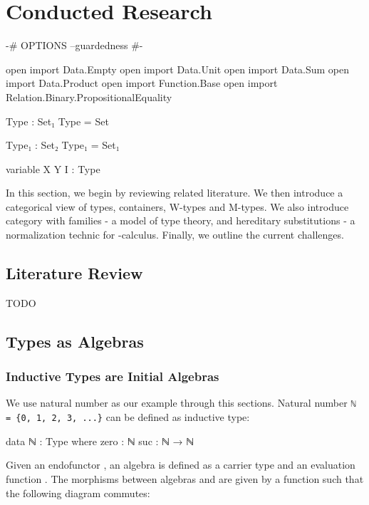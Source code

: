 \chapter{Conducted Research}

\begin{code}[hide]
{-# OPTIONS --guardedness #-}

open import Data.Empty
open import Data.Unit
open import Data.Sum
open import Data.Product
open import Function.Base
open import Relation.Binary.PropositionalEquality

Type : Set₁
Type = Set

Type₁ : Set₂
Type₁ = Set₁

variable X Y I : Type
\end{code}

In this section, we begin by reviewing related literature. We then introduce a categorical view of types, containers, W-types and M-types. We also introduce category with families - a model of type theory, and hereditary substitutions - a normalization technic for \lambda-calculus. Finally, we outline the current challenges.

\section{Literature Review}
TODO

\section{Types as Algebras}

\subsection{Inductive Types are Initial Algebras}

We use natural number as our example through this sections. Natural number \texttt{ℕ = \{0, 1, 2, 3, ...\}} can be defined as inductive type:
\begin{code}
data ℕ : Type where
  zero : ℕ
  suc : ℕ → ℕ
\end{code}

Given an endofunctor  \AgdaSymbol{:}   , an algebra is defined as a carrier type  \AgdaSymbol{:}  and an evaluation function  \AgdaSymbol{:}    . The morphisms between algebras \AgdaSymbol{(} \AgdaInductiveConstructor{,} \AgdaSymbol{)} and \AgdaSymbol{(} \AgdaInductiveConstructor{,} \AgdaSymbol{)} are given by a function  \AgdaSymbol{:}    such that the following diagram commutes:

